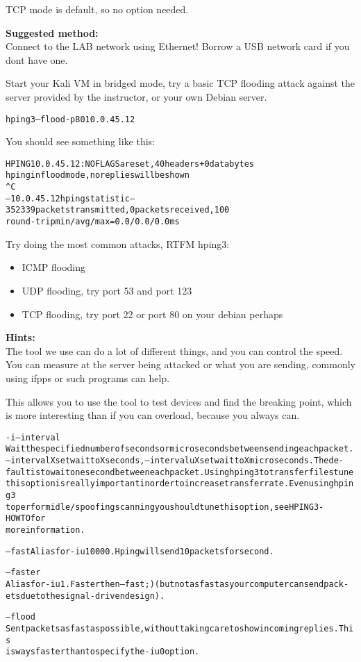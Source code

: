 \documentclass[a4paper,11pt,notitlepage]{report}
\begin{document}
TCP mode is default, so no option needed.


{\bf Suggested method:}\\
Connect to the LAB network using Ethernet! Borrow a USB network card if you dont have one.

Start your Kali VM in bridged mode, try a basic TCP flooding attack against the server provided by the instructor, or your own Debian server.

\begin{alltt}\footnotesize
hping3 --flood -p 80 10.0.45.12
\end{alltt}

You should see something like this:
\begin{alltt}\footnotesize
HPING 10.0.45.12: NO FLAGS are set, 40 headers + 0 data bytes
hping in flood mode, no replies will be shown
^C
--- 10.0.45.12 hping statistic ---
352339 packets transmitted, 0 packets received, 100% packet loss
round-trip min/avg/max = 0.0/0.0/0.0 ms
\end{alltt}

Try doing the most common attacks, RTFM hping3:
\begin{itemize}
\item ICMP flooding
\item UDP flooding, try port 53 and port 123
\item TCP flooding, try port 22 or port 80 on your debian perhaps
\end{itemize}


{\bf Hints:}\\
The tool we use can do a lot of different things, and you can control the speed. You can measure at the server being attacked or what you are sending, commonly using ifpps or such programs can help.

This allows you to use the tool to test devices and find the breaking point, which is more interesting than if you can overload, because you always can.
\begin{alltt}\footnotesize
-i --interval
       Wait  the  specified  number  of  seconds or micro seconds between sending each packet.
       --interval X set wait to X seconds, --interval uX set wait to X micro seconds.  The de‐
       fault  is  to  wait one second between each packet. Using hping3 to transfer files tune
       this option is really important in order to increase transfer rate. Even  using  hping3
       to  perform  idle/spoofing  scanning  you should tune this option, see HPING3-HOWTO for
       more information.

--fast Alias for -i u10000. Hping will send 10 packets for second.

--faster
       Alias for -i u1. Faster then --fast ;) (but not as fast as your computer can send pack‐
       ets due to the signal-driven design).

--flood
       Sent  packets  as fast as possible, without taking care to show incoming replies.  This
       is ways faster than to specify the -i u0 option.
\end{alltt}
\end{document}
